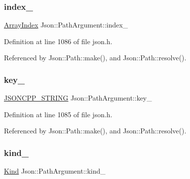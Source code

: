 \subsubsection{\texorpdfstring{index\+\_\+}{index\_}}
{\footnotesize\ttfamily \hyperlink{namespace_json_a8048e741f2177c3b5d9ede4a5b8c53c2}{Array\+Index} Json\+::\+Path\+Argument\+::index\+\_\+\hspace{0.3cm}{\ttfamily [private]}}



Definition at line 1086 of file json.\+h.



Referenced by Json\+::\+Path\+::make(), and Json\+::\+Path\+::resolve().

\mbox{\label{class_json_1_1_path_argument_af4024368548ff730ef2bed97d6f1ca43}} 
\subsubsection{\texorpdfstring{key\+\_\+}{key\_}}
{\footnotesize\ttfamily \hyperlink{json_8h_a1e723f95759de062585bc4a8fd3fa4be}{J\+S\+O\+N\+C\+P\+P\+\_\+\+S\+T\+R\+I\+NG} Json\+::\+Path\+Argument\+::key\+\_\+\hspace{0.3cm}{\ttfamily [private]}}



Definition at line 1085 of file json.\+h.



Referenced by Json\+::\+Path\+::make(), and Json\+::\+Path\+::resolve().

\mbox{\label{class_json_1_1_path_argument_ad4bc4b544b155a3d9c7788572ecf991b}} 
\subsubsection{\texorpdfstring{kind\+\_\+}{kind\_}}
{\footnotesize\ttfamily \hyperlink{class_json_1_1_path_argument_a2420bbad778573c147e578701b84d9b9}{Kind} Json\+::\+Path\+Argument\+::kind\+\_\+\hspace{0.3cm}{\ttfamily [private]}}



